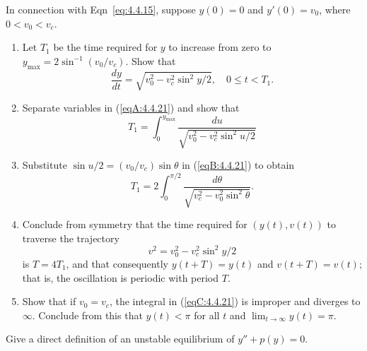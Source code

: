 \documentclass{ximera}
\begin{document}
\begin{problem}\label{exer:4.4.21}
In connection with Eqn~\eqref{eq:4.4.15},
suppose   $y(0)=0$ and $y'(0)=v_0$, where $0<v_0<v_c$.
\begin{enumerate}
\item %
Let  $T_1$ be the time
required for  $y$ to increase from zero to
$y_{\max}=2\sin^{-1}(v_0/v_c)$. Show that
\begin{equation}\label{eqA:4.4.21}
\frac{dy}{dt}=\sqrt{v_0^2-v_c^2\sin^2y/2},\quad 0\le t<T_1.
\end{equation}
\item %
Separate variables in (\ref{eqA:4.4.21}) and show that
\begin{equation}\label{eqB:4.4.21}
T_1=\int_0^{y_{\max}}\frac{du}{\sqrt{v_0^2-v_c^2\sin^2u/2}}
\end{equation}
\item %
Substitute $\sin u/2=(v_0/v_c)\sin\theta$ in (\ref{eqB:4.4.21}) to obtain
\begin{equation}\label{eqC:4.4.21}
T_1=2\int_0^{\pi/2}\frac{d\theta}{\sqrt{v_c^2-v_0^2\sin^2\theta}}.
\end{equation}
\item %
Conclude from  symmetry
that  the time required for  $(y(t),v(t))$ to traverse the
trajectory
$$
v^2=v_0^2-v_c^2\sin^2y/2
$$
is $T=4T_1$, and that consequently $y(t+T)=y(t)$ and $v(t+T)=v(t)$;
that is, the oscillation is periodic with period $T$.
\item %
Show that if $v_0=v_c$,  the integral in (\ref{eqC:4.4.21}) is improper and
diverges to $\infty$. Conclude from this  that $y(t)<\pi$
for all $t$ and $\lim_{t\to\infty}y(t)=\pi$.
\end{enumerate}
\end{problem}

\begin{problem}\label{exer:4.4.22}
Give a direct definition of an unstable equilibrium of $y''+p(y)=0$.
\end{problem}
\end{document}
